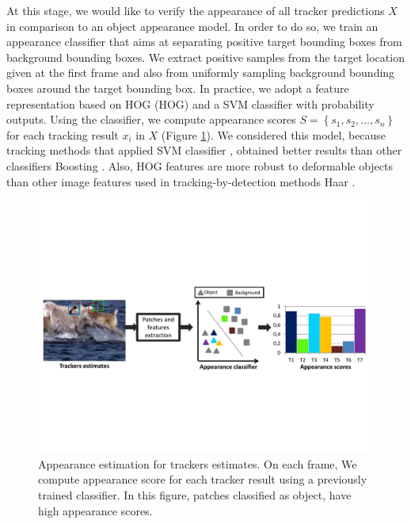At this stage, we would like to verify the appearance of all tracker
predictions $X$ in comparison to an object appearance model.
In order to do so, we train an appearance classifier that aims at separating
positive target bounding boxes from background bounding boxes.
We extract positive samples from the target location given at the first frame
and also from uniformly sampling background bounding boxes around the target
bounding box.
In practice, we adopt a feature representation based on \gls{HOG} (HOG) and a SVM
classifier with probability outputs.
Using the classifier, we compute appearance scores  
$S = \left \{ s_1, s_2, ..., s_n \right \}$ for each tracking result $x_i$ in
$X$ (Figure \ref{fig::svm_app}). We considered this model, because tracking methods
that applied SVM classifier \cite{zhang2014meem,Bai2013}, obtained better results
than other classifiers \eg Boosting \cite{Grabner2006,Grabner2008}.
Also, HOG features are
more robust to deformable objects than other image features used in
tracking-by-detection methods \eg Haar \cite{Avidan2007}.

\begin{figure}[h!]
\centering
\includegraphics[page=1, width=1\linewidth, trim= 0.2cm 6cm 0.2cm 6.5cm,
                 clip=true]{Figures/figures_mod}
\caption[Appearance estimation for trackers estimates.]
        {\small Appearance estimation for trackers estimates. On each frame,
        We compute appearance score for each tracker result using a previously
        trained classifier. In this figure, patches classified as object, have high
        appearance scores.}
\label{fig::svm_app}
\end{figure}


